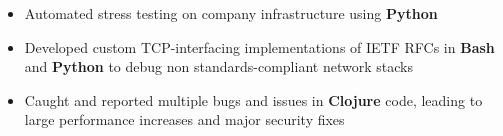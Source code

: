 \documentclass[10pt,letterpaper]{altacv}
\begin{document}

\begin{fullwidth}
\makecvheader
\end{fullwidth}



\begin{itemize}
    \item Automated stress testing on company infrastructure using 
        \textbf{Python}
    \item Developed custom TCP-interfacing implementations of IETF RFCs in 
        \textbf{Bash} and \textbf{Python} to debug non standards-compliant 
        network stacks
    \item Caught and reported multiple bugs and issues in \textbf{Clojure} code, 
        leading to large performance increases and major security fixes
\end{itemize}
\end{document}
